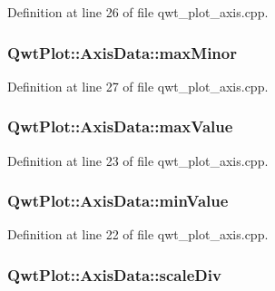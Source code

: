 Definition at line 26 of file qwt\-\_\-plot\-\_\-axis.\-cpp.

\hypertarget{class_qwt_plot_1_1_axis_data_a88eee27f67093c1d200021ab4acb0c81}{
\subsubsection[{max\-Minor}]{ Qwt\-Plot\-::\-Axis\-Data\-::max\-Minor}}\label{class_qwt_plot_1_1_axis_data_a88eee27f67093c1d200021ab4acb0c81}


Definition at line 27 of file qwt\-\_\-plot\-\_\-axis.\-cpp.

\hypertarget{class_qwt_plot_1_1_axis_data_a3c1bb666b282447afdd57b7e29b02fb7}{
\subsubsection[{max\-Value}]{ Qwt\-Plot\-::\-Axis\-Data\-::max\-Value}}\label{class_qwt_plot_1_1_axis_data_a3c1bb666b282447afdd57b7e29b02fb7}


Definition at line 23 of file qwt\-\_\-plot\-\_\-axis.\-cpp.

\hypertarget{class_qwt_plot_1_1_axis_data_a8976da918565bb63416cb683ed1b9f7f}{
\subsubsection[{min\-Value}]{ Qwt\-Plot\-::\-Axis\-Data\-::min\-Value}}\label{class_qwt_plot_1_1_axis_data_a8976da918565bb63416cb683ed1b9f7f}


Definition at line 22 of file qwt\-\_\-plot\-\_\-axis.\-cpp.

\hypertarget{class_qwt_plot_1_1_axis_data_a59fd6434f3835fd3f5a1a10898b0da87}{
\subsubsection[{scale\-Div}]{ Qwt\-Plot\-::\-Axis\-Data\-::scale\-Div}}\label{class_qwt_plot_1_1_axis_data_a59fd6434f3835fd3f5a1a10898b0da87}


